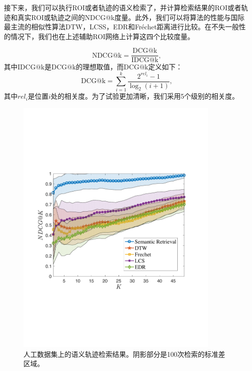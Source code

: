 接下来，我们可以执行ROI或者轨迹的语义检索了，并计算检索结果的ROI或者轨迹和真实ROI或轨迹之间的NDCG@k度量。此外，我们可以将算法的性能与国际最主流的相似性算法DTW，LCSS，EDR和Fr\'echet距离进行比较。在不失一般性的情况下，我们也在上述辅助ROI网络上计算这四个比较度量。


\begin{equation}
\mathrm{NDCG@k} = \frac{\mathrm{DCG@k}}{\mathrm{IDCG@k}},
\label{eq:NDCG}
\end{equation}
其中$\mathrm{IDCG@k}$是$\mathrm{DCG@k}$的理想取值，而$\mathrm{DCG@k}$定义如下：
\begin{equation}
\mathrm{DCG@{k}} = \sum_{i=1}^{k} \frac{ 2^{rel_{i}} - 1 }{ \log_{2}(i+1)},
\label{eq:DCG}
\end{equation}
其中$rel_i$是位置$i$处的相关度。为了试验更加清晰，我们采用5个级别的相关度。



\tabcolsep=0.5pt
\begin{figure}[!b]
\centering
\includegraphics[width=100mm]{pics/synNDCG.pdf}
\caption{人工数据集上的语义轨迹检索结果。阴影部分是100次检索的标准差区域。}
\label{fig:synNDCG}
\end{figure}

